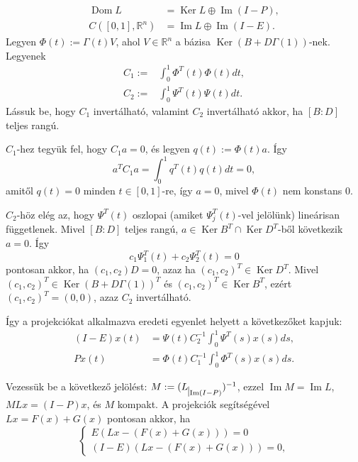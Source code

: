 \documentclass[oneside, titlepage, 12pt, a4paper]{report}
\DeclareMathOperator{\Ima}{Im}	%
\DeclareMathOperator{\Ker}{Ker}	%
\DeclareMathOperator{\Dom}{Dom}	%
\begin{document}
\begin{align*}
\Dom L &= \Ker L \oplus \Ima (I - P), \\
C([0, 1], \mathbb{R}^n) &= \Ima L \oplus \Ima (I - E).
\end{align*}
Legyen $\Phi(t) := \Gamma(t) V$, ahol $V \in \mathbb{R}^n$ a bázisa $\Ker (B + D\Gamma(1))$-nek. Legyenek
\begin{align*}
C_1 :=& \int_0^1 \Phi^T(t) \Phi(t) dt, \\
C_2 :=& \int_0^1 \Psi^T(t) \Psi(t) dt.
\end{align*}
Lássuk be, hogy $C_1$ invertálható, valamint $C_2$ invertálható akkor, ha $[B : D]$ teljes rangú. \par
$C_1$-hez tegyük fel, hogy $C_1 a = 0$, és legyen $q(t) := \Phi(t) a$. Így
\begin{equation*}
a^T C_1 a = \int_0^1 q^T(t) q(t) dt = 0,
\end{equation*}
amitől $q(t) = 0$ minden $t \in [0, 1]$-re, így $a = 0$, mivel $\Phi(t)$ nem konstans 0. \par
$C_2$-höz elég az, hogy $\Psi^T(t)$ oszlopai (amiket $\Psi_j^T(t)$-vel jelölünk) lineárisan függetlenek. Mivel $[B : D]$ teljes rangú, $a \in \Ker B^T \cap \Ker D^T$-ből következik $a = 0$. Így
\begin{equation*}
c_1 \Psi_1^T(t) + c_2 \Psi_2^T(t) = 0
\end{equation*}
pontosan akkor, ha $(c_1, c_2) D = 0$, azaz ha $(c_1, c_2)^T \in \Ker D^T$. Mivel $(c_1, c_2)^T \in \Ker (B + D\Gamma(1))^T$ és $(c_1, c_2)^T \in \Ker B^T$, ezért $(c_1, c_2)^T = (0, 0)$, azaz $C_2$ invertálható. \par
Így a projekciókat alkalmazva eredeti egyenlet helyett a következőket kapjuk:
\begin{align*}
(I - E) x(t) &= \Psi(t) C_2^{-1} \int_0^1 \Psi^T(s) x(s) ds, \\
P x(t) &= \Phi(t) C_1^{-1} \int_0^1 \Phi^T(s) x(s) ds.
\end{align*} \par
Vezessük be a következő jelölést: $M := (L_{\mkern 1mu \vrule height 2ex\mkern2mu \Ima (I - P)})^{-1}$, ezzel $\Ima M = \Ima L$, $M L x = (I - P) x$, és $M$ kompakt. A projekciók segítségével $Lx = F(x) + G(x)$ pontosan akkor, ha
\begin{equation*}
\begin{cases}
E (Lx - (F(x) + G(x))) = 0 \\
(I - E)(Lx - (F(x) + G(x))) = 0,
\end{cases}
\end{equation*}
\end{document}
